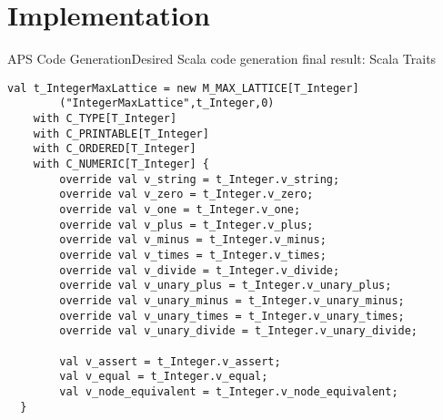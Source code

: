 \section{Implementation}


\begin{frame}[fragile=singleslide]{APS Code Generation}{Desired Scala code generation final result: Scala Traits}


\begin{Verbatim}[fontsize=\tiny]
val t_IntegerMaxLattice = new M_MAX_LATTICE[T_Integer]
        ("IntegerMaxLattice",t_Integer,0)
    with C_TYPE[T_Integer]
    with C_PRINTABLE[T_Integer]
    with C_ORDERED[T_Integer]
    with C_NUMERIC[T_Integer] {
        override val v_string = t_Integer.v_string;
        override val v_zero = t_Integer.v_zero;
        override val v_one = t_Integer.v_one;
        override val v_plus = t_Integer.v_plus;
        override val v_minus = t_Integer.v_minus;
        override val v_times = t_Integer.v_times;
        override val v_divide = t_Integer.v_divide;
        override val v_unary_plus = t_Integer.v_unary_plus;
        override val v_unary_minus = t_Integer.v_unary_minus;
        override val v_unary_times = t_Integer.v_unary_times;
        override val v_unary_divide = t_Integer.v_unary_divide;
        
        val v_assert = t_Integer.v_assert;
        val v_equal = t_Integer.v_equal;
        val v_node_equivalent = t_Integer.v_node_equivalent;
  }
\end{Verbatim}

\end{frame}




